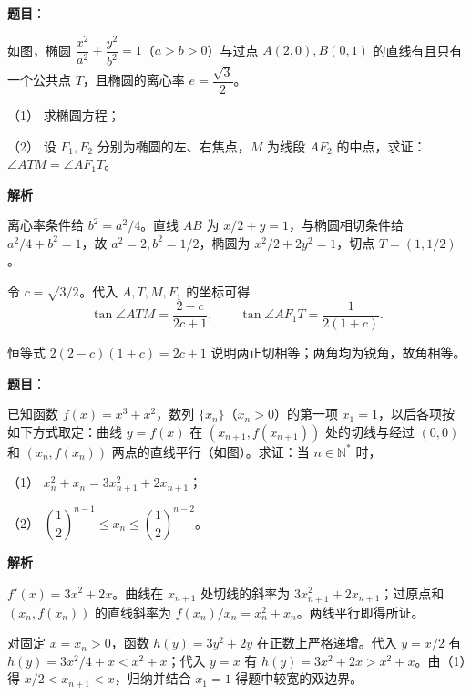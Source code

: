 \begin{answer}

\textbf{题目}：

如图，椭圆 $\dfrac{x^2}{a^2}+\dfrac{y^2}{b^2}=1$（$a>b>0$）与过点 $A(2,0),B(0,1)$ 的直线有且只有一个公共点 $T$，且椭圆的离心率 $e=\dfrac{\sqrt3}{2}$。

（1） 求椭圆方程；

（2） 设 $F_1,F_2$ 分别为椭圆的左、右焦点，$M$ 为线段 $AF_2$ 的中点，求证：$\angle ATM=\angle AF_1T$。
\nopagebreak[4]
\begin{center}\end{center}
\nopagebreak[4]
\textbf{解析}


离心率条件给 $b^2=a^2/4$。直线 $AB$ 为 $x/2+y=1$，与椭圆相切条件给 $a^2/4+b^2=1$，故 $a^2=2,b^2=1/2$，椭圆为 $x^2/2+2y^2=1$，切点 $T=(1,1/2)$。


令 $c=\sqrt{3/2}$。代入 $A,T,M,F_1$ 的坐标可得
\nopagebreak[4]
\[
\tan\angle ATM=\frac{2-c}{2c+1},\qquad
\tan\angle AF_1T=\frac1{2(1+c)}.
\]

恒等式 $2(2-c)(1+c)=2c+1$ 说明两正切相等；两角均为锐角，故角相等。



\end{answer}
\begin{answer}

\textbf{题目}：

已知函数 $f(x)=x^3+x^2$，数列 $\{x_n\}$（$x_n>0$）的第一项 $x_1=1$，以后各项按如下方式取定：曲线 $y=f(x)$ 在 $(x_{n+1},f(x_{n+1}))$ 处的切线与经过 $(0,0)$ 和 $(x_n,f(x_n))$ 两点的直线平行（如图）。求证：当 $n\in\mathbb N^*$ 时，

（1） $x_n^2+x_n=3x_{n+1}^2+2x_{n+1}$；

（2） $\left(\dfrac12\right)^{n-1}\leqslant x_n\leqslant\left(\dfrac12\right)^{n-2}$。
\nopagebreak[4]
\begin{center}\end{center}
\nopagebreak[4]
\textbf{解析}


$f'(x)=3x^2+2x$。曲线在 $x_{n+1}$ 处切线的斜率为 $3x_{n+1}^2+2x_{n+1}$；过原点和 $(x_n,f(x_n))$ 的直线斜率为 $f(x_n)/x_n=x_n^2+x_n$。两线平行即得所证。


对固定 $x=x_n>0$，函数 $h(y)=3y^2+2y$ 在正数上严格递增。代入 $y=x/2$ 有 $h(y)=3x^2/4+x<x^2+x$；代入 $y=x$ 有 $h(y)=3x^2+2x>x^2+x$。由（1）得 $x/2<x_{n+1}<x$，归纳并结合 $x_1=1$ 得题中较宽的双边界。



\end{answer}